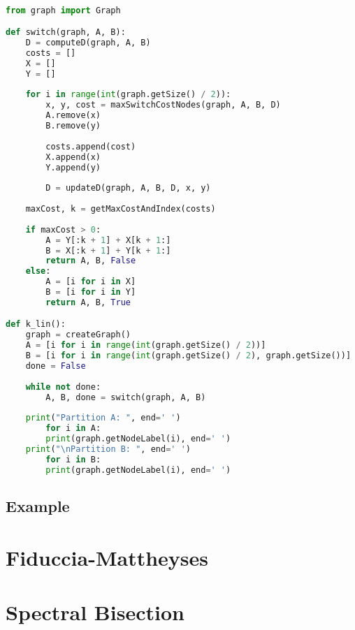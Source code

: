 \begin{lstlisting}[language=Python]

from graph import Graph

def switch(graph, A, B):
	D = computeD(graph, A, B)
	costs = []
	X = []
	Y = []
	
	for i in range(int(graph.getSize() / 2)):
		x, y, cost = maxSwitchCostNodes(graph, A, B, D)
		A.remove(x)
		B.remove(y)
		
		costs.append(cost)
		X.append(x)
		Y.append(y)
		
		D = updateD(graph, A, B, D, x, y)
	
	maxCost, k = getMaxCostAndIndex(costs)
	
	if maxCost > 0:
		A = Y[:k + 1] + X[k + 1:]
		B = X[:k + 1] + Y[k + 1:]
		return A, B, False
	else:
		A = [i for i in X]
		B = [i for i in Y]
		return A, B, True

def k_lin():
	graph = createGraph()
	A = [i for i in range(int(graph.getSize() / 2))]
	B = [i for i in range(int(graph.getSize() / 2), graph.getSize())]
	done = False
	
	while not done:
		A, B, done = switch(graph, A, B)
	
	print("Partition A: ", end=' ')
		for i in A:
		print(graph.getNodeLabel(i), end=' ')
	print("\nPartition B: ", end=' ')
		for i in B:
		print(graph.getNodeLabel(i), end=' ')

\end{lstlisting}

\subsection{Example}

\section{Fiduccia-Mattheyses}

\section{Spectral Bisection}



